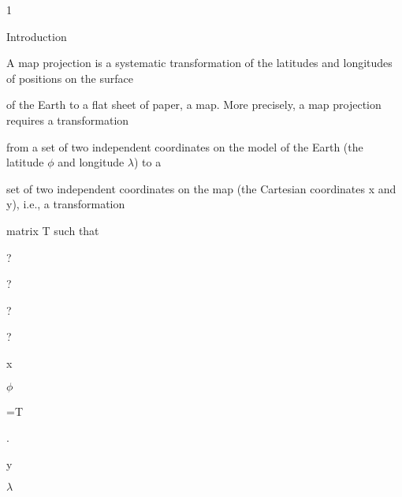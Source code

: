 \documentclass[a4paper,portrait,12pt]{article}
\begin{document}
1





\begin{flushleft}
Introduction
\end{flushleft}





\begin{flushleft}
A map projection is a systematic transformation of the latitudes and longitudes of positions on the surface
\end{flushleft}


\begin{flushleft}
of the Earth to a flat sheet of paper, a map. More precisely, a map projection requires a transformation
\end{flushleft}


\begin{flushleft}
from a set of two independent coordinates on the model of the Earth (the latitude $\phi$ and longitude $\lambda$) to a
\end{flushleft}


\begin{flushleft}
set of two independent coordinates on the map (the Cartesian coordinates x and y), i.e., a transformation
\end{flushleft}


\begin{flushleft}
matrix T such that
\end{flushleft}


?


?


?


?


\begin{flushleft}
x
\end{flushleft}


\begin{flushleft}
$\phi$
\end{flushleft}


\begin{flushleft}
=T
\end{flushleft}


.


\begin{flushleft}
y
\end{flushleft}


\begin{flushleft}
$\lambda$
\end{flushleft}
\end{document}
